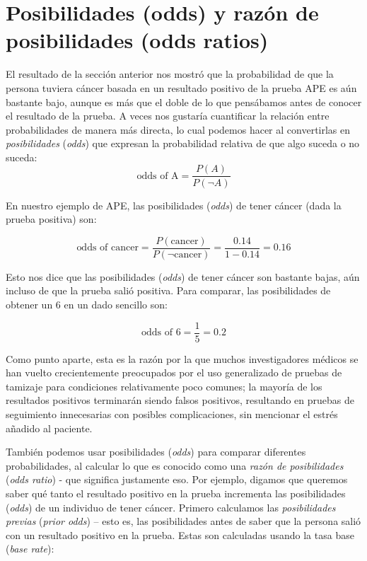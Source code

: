 \documentclass[
  12pt,
]{book}
\begin{document}
\hypertarget{posibilidades-odds-y-razuxf3n-de-posibilidades-odds-ratios}{%
\section{Posibilidades (odds) y razón de posibilidades (odds ratios)}\label{posibilidades-odds-y-razuxf3n-de-posibilidades-odds-ratios}}

El resultado de la sección anterior nos mostró que la probabilidad de que la persona tuviera cáncer basada en un resultado positivo de la prueba APE es aún bastante bajo, aunque es más que el doble de lo que pensábamos antes de conocer el resultado de la prueba. A veces nos gustaría cuantificar la relación entre probabilidades de manera más directa, lo cual podemos hacer al convertirlas en \emph{posibilidades} (\emph{odds}) que expresan la probabilidad relativa de que algo suceda o no suceda:
\[
\text{odds of A} = \frac{P(A)}{P(\neg A)}
\]

En nuestro ejemplo de APE, las posibilidades (\emph{odds}) de tener cáncer (dada la prueba positiva) son:

\[
\text{odds of cancer} = \frac{P(\text{cancer})}{P(\neg \text{cancer})} =\frac{0.14}{1 - 0.14} = 0.16
\]

Esto nos dice que las posibilidades (\emph{odds}) de tener cáncer son bastante bajas, aún incluso de que la prueba salió positiva. Para comparar, las posibilidades de obtener un 6 en un dado sencillo son:

\[
\text{odds of 6} = \frac{1}{5} = 0.2
\]

Como punto aparte, esta es la razón por la que muchos investigadores médicos se han vuelto crecientemente preocupados por el uso generalizado de pruebas de tamizaje para condiciones relativamente poco comunes; la mayoría de los resultados positivos terminarán siendo falsos positivos, resultando en pruebas de seguimiento innecesarias con posibles complicaciones, sin mencionar el estrés añadido al paciente.

También podemos usar posibilidades (\emph{odds}) para comparar diferentes probabilidades, al calcular lo que es conocido como una \emph{razón de posibilidades} (\emph{odds ratio}) - que significa justamente eso. Por ejemplo, digamos que queremos saber qué tanto el resultado positivo en la prueba incrementa las posibilidades (\emph{odds}) de un individuo de tener cáncer. Primero calculamos las \emph{posibilidades previas} (\emph{prior odds}) -- esto es, las posibilidades antes de saber que la persona salió con un resultado positivo en la prueba. Estas son calculadas usando la tasa base (\emph{base rate}):
\end{document}
